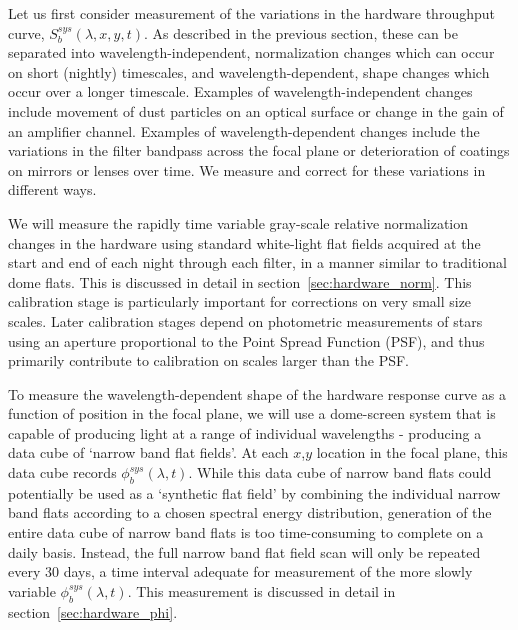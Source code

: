 \documentclass[12pt,preprint]{aastex}
\begin{document}
Let us first consider measurement of the variations in the hardware
throughput curve, $S_b^{sys}(\lambda,x,y,t)$. As described in the
previous section, these can be separated into wavelength-independent,
normalization changes which can occur on short (nightly) timescales,
and wavelength-dependent, shape changes which occur over a longer
timescale. Examples of wavelength-independent changes include movement
of dust particles on an optical surface or change in the gain of an
amplifier channel. Examples of wavelength-dependent changes include
the variations in the filter bandpass across the focal plane or
deterioration of coatings on mirrors or lenses over time. We measure
and correct for these variations in different ways.

We will measure the rapidly time variable gray-scale relative
normalization changes in the hardware using standard white-light flat
fields acquired at the start and end of each night through each
filter, in a manner similar to traditional dome flats. This is
discussed in detail in section~\ref{sec:hardware_norm}.  This
calibration stage is particularly important for corrections on very
small size scales. Later calibration stages depend on photometric
measurements of stars using an aperture proportional to the Point
Spread Function (PSF), and thus primarily contribute to calibration on
scales larger than the PSF.

To measure the wavelength-dependent shape of the hardware response
curve as a function of position in the focal plane, we will use a
dome-screen system that is capable of producing light at a range of
individual wavelengths - producing a data cube of `narrow band flat
fields'.  At each $x$,$y$ location in the focal plane, this data cube
records $\phi_b^{sys}(\lambda,t)$. While this data cube of narrow band
flats could potentially be used as a `synthetic flat field' by
combining the individual narrow band flats according to a chosen
spectral energy distribution, generation of the entire data cube of
narrow band flats is too time-consuming to complete on a daily
basis. Instead, the full narrow band flat field scan will only be
repeated every 30 days, a time interval adequate for measurement of
the more slowly variable $\phi_b^{sys}(\lambda,t)$. This measurement
is discussed in detail in section~\ref{sec:hardware_phi}.
\end{document}
